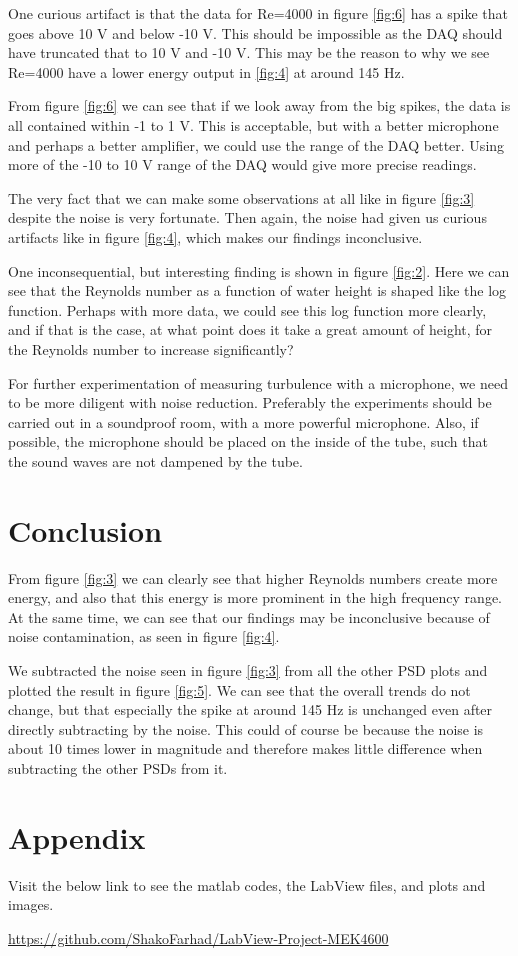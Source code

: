 \documentclass[english,a4paper,12pt]{article}
\begin{document}
One curious artifact is that the data for Re=4000 in figure \ref{fig:6} has a spike that goes above 10 V and below -10 V. This should be impossible as the DAQ should have truncated that to 10 V and -10 V. This may be the reason to why we see Re=4000 have a lower energy output in \ref{fig:4} at around 145 Hz. \bigskip

From figure \ref{fig:6} we can see that if we look away from the big spikes, the data is all contained within -1 to 1 V. This is acceptable, but with a better microphone and perhaps a better amplifier, we could use the range of the DAQ better. Using more of the -10 to 10 V range of the DAQ would give more precise readings. \bigskip

The very fact that we can make some observations at all like in figure \ref{fig:3} despite the noise is very fortunate. Then again, the noise had given us curious artifacts like in figure \ref{fig:4}, which makes our findings inconclusive.\bigskip

One inconsequential, but interesting finding is shown in figure \ref{fig:2}. Here we can see that the Reynolds number as a function of water height is shaped like the log function. Perhaps with more data, we could see this log function more clearly, and if that is the case, at what point does it take a great amount of height, for the Reynolds number to increase significantly? \bigskip

For further experimentation of measuring turbulence with a microphone, we need to be more diligent with noise reduction. Preferably the experiments should be carried out in a soundproof room, with a more powerful microphone. Also, if possible, the microphone should be placed on the inside of the tube, such that the sound waves are not dampened by the tube.

\section*{Conclusion}
From figure \ref{fig:3} we can clearly see that higher Reynolds numbers create more energy, and also that this energy is more prominent in the high frequency range. At the same time, we can see that our findings may be inconclusive because of noise contamination, as seen in figure \ref{fig:4}. \bigskip

We subtracted the noise seen in figure \ref{fig:3} from all the other PSD plots and plotted the result in figure \ref{fig:5}. We can see that the overall trends do not change, but that especially the spike at around 145 Hz is unchanged even after directly subtracting by the noise. This could of course be because the noise is about 10 times lower in magnitude and therefore makes little difference when subtracting the other PSDs from it. 

\section*{Appendix}
Visit the below link to see the matlab codes, the LabView files, and plots and images.

\url{https://github.com/ShakoFarhad/LabView-Project-MEK4600}


 \bigskip \bigskip
\end{document}
